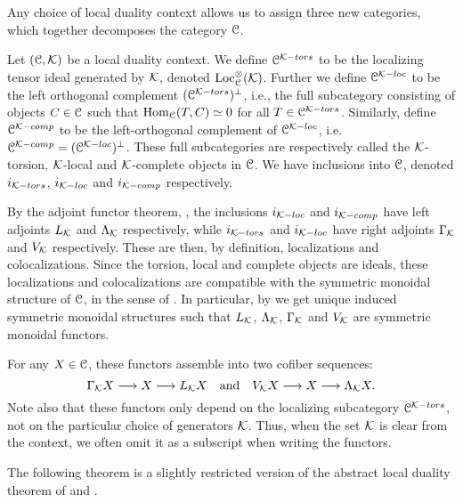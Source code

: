 Any choice of local duality context allows us to assign three new categories, which together decomposes the category $\EuScript{C}$. 

\begin{construction}
    Let $(\EuScript{C}, \mathcal{K})$ be a local duality context. We define $\EuScript{C}^{\mathcal{K}-tors}$ to be the localizing tensor ideal generated by $\mathcal{K}$, denoted $\operatorname{Loc}^\otimes_{\EuScript{C}}(\mathcal{K})$. Further we define $\EuScript{C}^{\mathcal{K}-loc}$ to be the left orthogonal complement $(\EuScript{C}^{\mathcal{K}-tors})^\perp$, i.e., the full subcategory consisting of objects $C\in \EuScript{C}$ such that $\operatorname{Hom}_{\EuScript{C}}(T,C)\simeq 0$ for all $T\in \EuScript{C}^{\mathcal{K}-tors}$. Similarly, define $\EuScript{C}^{\mathcal{K}-comp}$ to be the left-orthogonal complement of $\EuScript{C}^{\mathcal{K}-loc}$, i.e. $\EuScript{C}^{\mathcal{K}-comp}= (\EuScript{C}^{\mathcal{K}-loc})^\perp$. These full subcategories are respectively called the $\mathcal{K}$-torsion, $\mathcal{K}$-local and $\mathcal{K}$-complete objects in $\EuScript{C}$. We have inclusions into $\EuScript{C}$, denoted $i_{\mathcal{K}-tors}$, $i_{\mathcal{K}-loc}$ and $i_{\mathcal{K}-comp}$ respectively. 
    
    By the adjoint functor theorem, \cite[5.5.2.9]{lurie_09}, the inclusions $i_{\mathcal{K}-loc}$ and $i_{\mathcal{K}-comp}$ have left adjoints $L_{\mathcal{K}}$ and $\Lambda_{\mathcal{K}}$ respectively, while $i_{\mathcal{K}-tors}$ and $i_{\mathcal{K}-loc}$ have right adjoints $\Gamma_{\mathcal{K}}$ and $V_{\mathcal{K}}$ respectively. These are then, by definition, localizations and colocalizations. Since the torsion, local and complete objects are ideals, these localizations and colocalizations are compatible with the symmetric monoidal structure of $\EuScript{C}$, in the sense of \cite[2.2.1.7]{Lurie_HA}. In particular, by \cite[2.2.1.9]{Lurie_HA} we get unique induced symmetric monoidal structures such that $L_{\mathcal{K}}$, $\Lambda_{\mathcal{K}}$, $\Gamma_{\mathcal{K}}$ and $V_{\mathcal{K}}$ are symmetric monoidal functors. 

    For any $X\in \EuScript{C}$, these functors assemble into two cofiber sequences:
    $$\Gamma_{\mathcal{K}} X \longrightarrow X \longrightarrow L_{\mathcal{K}} X \quad \text{and}\quad V_{\mathcal{K}} X \longrightarrow X \longrightarrow \Lambda_{\mathcal{K}} X.$$
    Note also that these functors only depend on the localizing subcategory $\EuScript{C}^{\mathcal{K}-tors}$, not on the particular choice of generators $\mathcal{K}$. Thus, when the set $\mathcal{K}$ is clear from the context, we often omit it as a subscript when writing the functors. 
\end{construction}

The following theorem is a slightly restricted version of the abstract local duality theorem of \cite[3.3.5]{hovey-palmiery-strickland_97} and \cite[2.21]{barthel-heard-valenzuela_2018}.  

